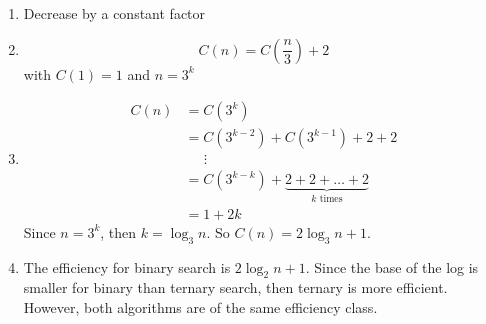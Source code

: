 \documentclass[letterpaper, 11pt]{article}
\begin{document}
\begin{enumerate}[label = (\alph*)]
  \item Decrease by a constant factor
  \item \[C(n) = C\left(\frac{n}{3}\right) + 2\]
    with \(C(1) = 1\) and \(n = 3^k\)
  \item 
    \begin{align*}
      C(n) &= C(3^k) \\
           &= C(3^{k-2}) + C(3^{k-1}) + 2 + 2\\
           &\;\;\;\;\;\vdots \\
           &= C(3^{k-k}) + \underbrace{2 + 2 + \dots + 2}_{k \text{ times}}\\
           &= 1 + 2k
    \end{align*}
    Since \(n = 3^k\), then \(k = \log_3 n\). So \(C(n) = 2\log_3 n + 1\).
  \item The efficiency for binary search is \(2\log_2 n + 1\). Since the base
    of the log is smaller for binary than ternary search, then ternary is more
    efficient. However, both algorithms are of the same efficiency class. 
\end{enumerate}
\end{document}
